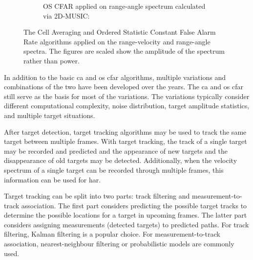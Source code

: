 \begin{figure}[H]
\begin{subfigure}{0.49\textwidth}
        \caption{OS CFAR applied on range-angle spectrum calculated via 2D-MUSIC:}
        \label{fig:os-cfar-music}
    \end{subfigure}
    \caption{
        The Cell Averaging and Ordered Statistic Constant False Alarm Rate algorithms applied on the range-velocity and range-angle spectra.
        The figures are scaled show the amplitude of the spectrum rather than power.
    }
    \label{fig:cfar-plots}
\end{figure}

In addition to the basic \gls{ca} and \gls{os} \gls{cfar} algorithms, multiple variations and combinations of the two have been developed over the years.
The \gls{ca} and \gls{os} \gls{cfar} still serve as the basis for most of the variations.
The variations typically consider different computational complexity, noise distribution,
target amplitude statistics, and multiple target situations. \cite{nato-radar-topics}

After target detection, target tracking algorithms may be used to track the same target between multiple frames.
With target tracking, the track of a single target may be recorded and predicted
and the appearance of new targets and the disappearance of old targets may be detected.
Additionally, when the velocity spectrum of a single target can be recorded through multiple frames,
this information can be used for \gls{har}.

Target tracking can be split into two parts: track filtering and measurement-to-track association.
The first part considers predicting the possible target tracks to determine the possible locations for a target in upcoming frames.
The latter part considers assigning measurements (detected targets) to predicted paths.
For track filtering, Kalman filtering is a popular choice.
For measurement-to-track association, nearest-neighbour filtering or probabilistic models are commonly used. \cite{modern-radar-1}

